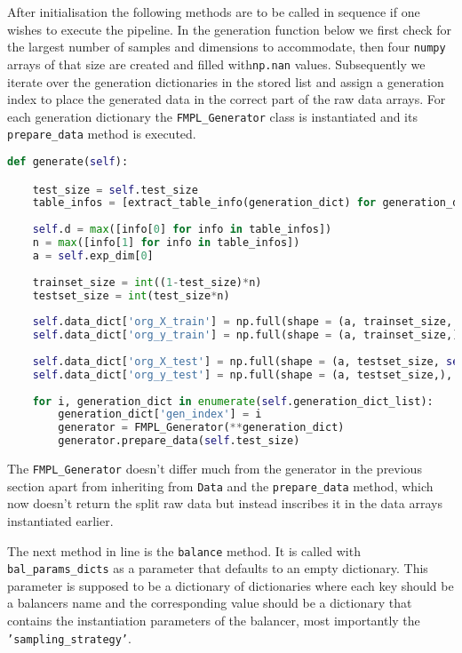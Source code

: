 After initialisation the following methods are to be called in sequence if one wishes to execute the pipeline. 
In the generation function below we first check for the largest number of samples and dimensions to accommodate, 
then four \texttt{numpy} arrays of that size are created and filled with\texttt{np.nan} values.
Subsequently we iterate over the generation dictionaries in the stored list and assign a generation index to place the generated data in the correct part of the raw data arrays.
For each generation dictionary the \texttt{FMPL\_Generator} class is instantiated and its \texttt{prepare\_data} method is executed.
\begin{lstlisting}[language=Python, numbers=none]
def generate(self):     

	test_size = self.test_size
	table_infos = [extract_table_info(generation_dict) for generation_dict in self.generation_dict_list]
	
	self.d = max([info[0] for info in table_infos])
	n = max([info[1] for info in table_infos])
	a = self.exp_dim[0]
	        
	trainset_size = int((1-test_size)*n)
	testset_size = int(test_size*n)
	
	self.data_dict['org_X_train'] = np.full(shape = (a, trainset_size, self.d), fill_value = np.nan)
	self.data_dict['org_y_train'] = np.full(shape = (a, trainset_size,), fill_value = np.nan)
	
	self.data_dict['org_X_test'] = np.full(shape = (a, testset_size, self.d), fill_value = np.nan)
	self.data_dict['org_y_test'] = np.full(shape = (a, testset_size,), fill_value = np.nan)
	
	for i, generation_dict in enumerate(self.generation_dict_list):
		generation_dict['gen_index'] = i
		generator = FMPL_Generator(**generation_dict)
		generator.prepare_data(self.test_size)
\end{lstlisting}

The \texttt{FMPL\_Generator} doesn't differ much from the generator in the previous section apart from inheriting from \texttt{Data} and the \texttt{prepare\_data} method,
which now doesn't return the split raw data but instead inscribes it in the data arrays instantiated earlier.

The next method in line is the \texttt{balance} method. It is called with \texttt{bal\_params\_dicts} as a parameter that defaults to an empty dictionary.
This parameter is supposed to be a dictionary of dictionaries where each key should be a balancers name and the corresponding value should be a dictionary 
that contains the instantiation parameters of the balancer, most importantly the \texttt{'sampling\_strategy'}.

